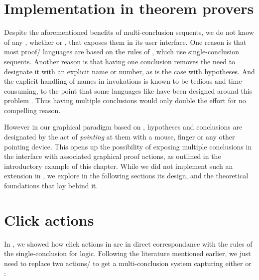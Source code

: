 \begin{scope}
\section{Implementation in theorem provers}

\AP
Despite the aforementioned benefits of multi-conclusion sequents, we do not know
of any , whether  or , that
exposes them in its user interface. One reason is that most proof/
languages are based on the rules of , which use
single-conclusion sequents. Another reason is that having one conclusion removes
the need to designate it with an explicit name or number, as is the case with
hypotheses. And the explicit handling of names in 
invokations is known to be tedious and time-consuming, to the point that some
 languages like {\intro{\ssreflect}} have been designed around this problem
. Thus having multiple conclusions would only double the effort
for no compelling reason.

However in our graphical paradigm based on , hypotheses
and conclusions are designated by the act of \emph{pointing} at them with a
mouse, finger or any other pointing device. This opens up the
possibility of exposing multiple conclusions in the interface with associated
graphical proof actions, as outlined in the introductory example of this
chapter. While we did not implement such an extension in , we explore
in the following sections its design, and the theoretical foundations that lay
behind it.

\section{Click actions}

In , we showed how click actions in  are in direct
correspondance with the rules of the single-conclusion  
for  logic. Following the literature mentioned earlier, we just
need to replace two actions/ to get a multi-conclusion system
capturing either  or  :


\end{scope}
